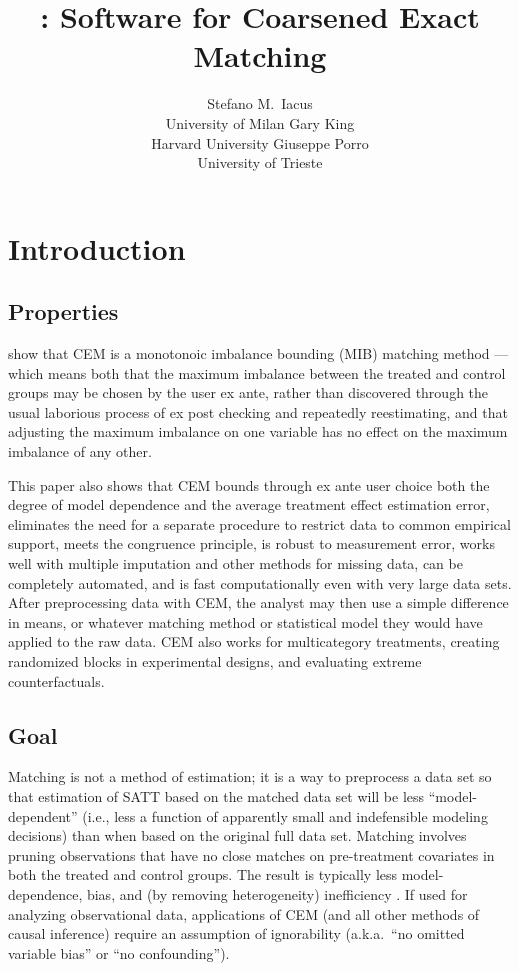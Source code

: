 \documentclass[article]{jss}
\title{\pkg{cem}: Software for Coarsened Exact Matching}
\author{Stefano M.\ Iacus\\ University of Milan \And 
        Gary King\\ Harvard University  \And Giuseppe Porro\\ University of Trieste}
\begin{document}
\section{Introduction}



\subsection{Properties}
\citet{IacKinPor08} show that CEM is a monotonoic imbalance bounding
(MIB) matching method --- which means both that the maximum imbalance
between the treated and control groups may be chosen by the user ex
ante, rather than discovered through the usual laborious process of ex
post checking and repeatedly reestimating, and that adjusting the
maximum imbalance on one variable has no effect on the
maximum imbalance of any other.

This paper also shows that CEM bounds through ex ante user choice both
the degree of model dependence and the average treatment effect
estimation error, eliminates the need for a separate procedure to
restrict data to common empirical support, meets the congruence
principle, is robust to measurement error, works well with multiple
imputation and other methods for missing data, can be completely
automated, and is fast computationally even with very large data sets.
After preprocessing data with CEM, the analyst may then use a simple
difference in means, or whatever matching method or statistical model
they would have applied to the raw data.  CEM also works for
multicategory treatments, creating randomized blocks in experimental
designs, and evaluating extreme counterfactuals.

\subsection{Goal}
Matching is not a method of estimation; it is a way to preprocess a
data set so that estimation of SATT based on the matched data set will
be less ``model-dependent'' (i.e., less a function of apparently small
and indefensible modeling decisions) than when based on the original
full data set.  Matching involves pruning observations that have no
close matches on pre-treatment covariates in both the treated and
control groups.  The result is typically less model-dependence, bias,
and (by removing heterogeneity) inefficiency
\citep{KinZen06,HoImaKin07,IacKinPor08}.  If used for analyzing
observational data, applications of CEM (and all other methods of
causal inference) require an assumption of ignorability (a.k.a.\ ``no
omitted variable bias'' or ``no confounding'').
\end{document}
